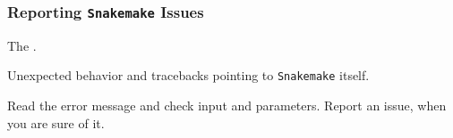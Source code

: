 \begin{frame}
  \frametitle{Reporting \texttt{Snakemake} Issues}
  \begin{question}[Where?]
  	 The .
  \end{question}	
  \pause
  \begin{question}[What?]
  	Unexpected behavior and tracebacks pointing to \texttt{Snakemake} itself. 
  \end{question}
  \pause
  \begin{question}[How?]
  	Read the error message and check input and parameters. Report an issue, when you are sure of it.
  \end{question}
\end{frame}

